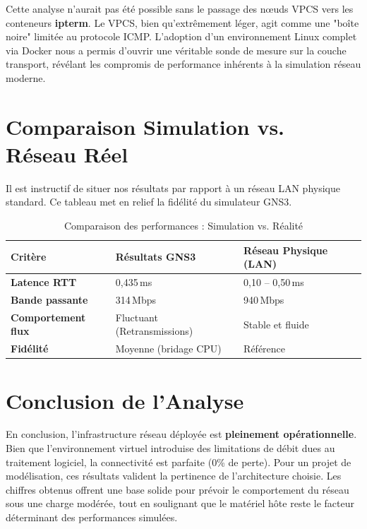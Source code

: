 \documentclass[11pt,a4paper,oneside]{report}
\begin{document}
\begin{tcolorbox}[defbox, title={Bilan technique : Transition du VPCS vers ipterm}]
Cette analyse n'aurait pas \'{e}t\'{e} possible sans le passage des nœuds VPCS vers les conteneurs \textbf{ipterm}. Le VPCS, bien qu'extr\^{e}mement l\'{e}ger, agit comme une "bo\^{i}te noire" limit\'{e}e au protocole ICMP. L'adoption d'un environnement Linux complet via Docker nous a permis d'ouvrir une v\'{e}ritable sonde de mesure sur la couche transport, r\'{e}v\'{e}lant les compromis de performance inhérents \`{a} la simulation r\'{e}seau moderne.
\end{tcolorbox}

\section{Comparaison Simulation vs. R\'{e}seau R\'{e}el}

Il est instructif de situer nos r\'{e}sultats par rapport \`{a} un r\'{e}seau LAN physique standard. Ce tableau met en relief la fid\'{e}lit\'{e} du simulateur GNS3.

\begin{table}[H]
\centering\small
\caption{Comparaison des performances : Simulation vs. R\'{e}alit\'{e}}
\label{tab:comparaison_finale}
\begin{tabularx}{\textwidth}{|>{\bfseries}l|X|X|}
\hline
\rowcolor{univblue}
\color{white}\textbf{Crit\`{e}re} & 
\color{white}\textbf{R\'{e}sultats GNS3} & 
\color{white}\textbf{R\'{e}seau Physique (LAN)} \\ \hline
Latence RTT & 0,435\,ms & 0,10 -- 0,50\,ms \\ \hline
\rowcolor{rowgray}
Bande passante & 314\,Mbps & 940\,Mbps \\ \hline
Comportement flux & Fluctuant (Retransmissions) & Stable et fluide \\ \hline
\rowcolor{rowgray}
Fid\'{e}lit\'{e} & Moyenne (bridage CPU) & R\'{e}f\'{e}rence \\ \hline
\end{tabularx}
\end{table}

\section{Conclusion de l'Analyse}

En conclusion, l'infrastructure r\'{e}seau d\'{e}ploy\'{e}e est \textbf{pleinement op\'{e}rationnelle}. Bien que l'environnement virtuel introduise des limitations de d\'{e}bit dues au traitement logiciel, la connectivit\'{e} est parfaite (0\% de perte). Pour un projet de mod\'{e}lisation, ces r\'{e}sultats valident la pertinence de l'architecture choisie. Les chiffres obtenus offrent une base solide pour pr\'{e}voir le comportement du r\'{e}seau sous une charge mod\'{e}r\'{e}e, tout en soulignant que le mat\'{e}riel h\^{o}te reste le facteur d\'{e}terminant des performances simul\'{e}es.
\end{document}
